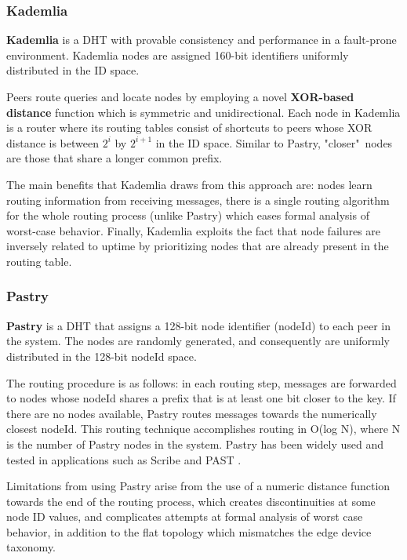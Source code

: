 \subsubsection*{Kademlia}

\textbf{Kademlia} \cite{maymounkov2002kademlia} is a DHT with provable consistency and performance in a fault-prone environment. Kademlia nodes are assigned 160-bit identifiers uniformly distributed in the ID space.

Peers route queries and locate nodes by employing a novel \textbf{XOR-based distance} function which is symmetric and unidirectional. Each node in Kademlia is a router where its routing tables consist of shortcuts to peers whose XOR distance is between \(2^{i}\) by \(2^{i + 1}\) in the ID space. Similar to Pastry, "closer"\ nodes are those that share a longer common prefix.

The main benefits that Kademlia draws from this approach are: nodes learn routing information from receiving messages, there is a single routing algorithm for the whole routing process (unlike Pastry) which eases formal analysis of worst-case behavior. Finally, Kademlia exploits the fact that node failures are inversely related to uptime by prioritizing nodes that are already present in the routing table.

\subsubsection*{Pastry}

\textbf{Pastry} \cite{rowstron2001pastry} is a DHT that assigns a 128-bit node identifier (nodeId) to each peer in the system. The nodes are randomly generated, and consequently are uniformly distributed in the 128-bit nodeId space. 

The routing procedure is as follows: in each routing step, messages are forwarded to nodes whose nodeId shares a prefix that is at least one bit closer to the key. If there are no nodes available, Pastry routes messages towards the numerically closest nodeId. This routing technique accomplishes routing in O(log N), where N is the number of Pastry nodes in the system. Pastry has been widely used and tested in applications such as Scribe \cite{10.1007/3-540-45546-9_3} and PAST \cite{990064}. 

Limitations from using Pastry arise from the use of a numeric distance function towards the end of the routing process, which creates discontinuities at some node ID values, and complicates attempts at formal analysis of worst case behavior, in addition to the flat topology which mismatches the edge device taxonomy.


